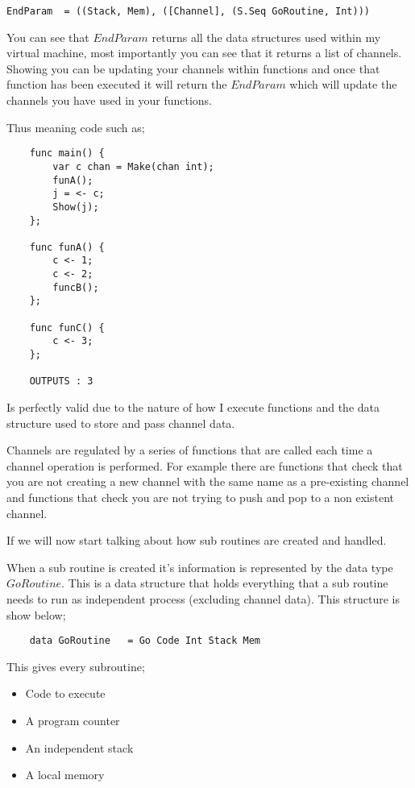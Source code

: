 \begin{lstlisting}
EndParam  = ((Stack, Mem), ([Channel], (S.Seq GoRoutine, Int))) 
\end{lstlisting}

You can see that $EndParam$ returns all the data structures used within my virtual machine, most importantly you can see that it returns a list of channels. Showing you can be updating your channels within functions and once that function has been executed it will return the $EndParam$  which will update the channels you have used in your functions.

Thus meaning code such as;

\begin{lstlisting}
	func main() {
		var c chan = Make(chan int);
		funA();
		j = <- c;
		Show(j);
	};
	
	func funA() {
		c <- 1;
		c <- 2;
		funcB();
	};
	
	func funC() {
		c <- 3;
	};

	OUTPUTS : 3
\end{lstlisting}

Is perfectly valid due to the nature of how I execute functions and the data structure used to store and pass channel data. 

Channels are regulated by a series of functions that are called each time a channel operation is performed. For example there are functions that check that you are not creating a new channel with the same name as a pre-existing channel and functions that check you are not trying to push and pop to a non existent channel.

If we will now start talking about how sub routines are created and handled.

When a sub routine is created it's information is represented by the data type $GoRoutine$. This is a data structure that holds everything that a sub routine needs to run as independent process (excluding channel data). This structure is show below;

\begin{lstlisting}
	data GoRoutine   = Go Code Int Stack Mem  
\end{lstlisting}   

This gives every subroutine;

\begin{itemize}
\item Code to execute
\item A program counter
\item An independent stack
\item A local memory
\end{itemize}
 


